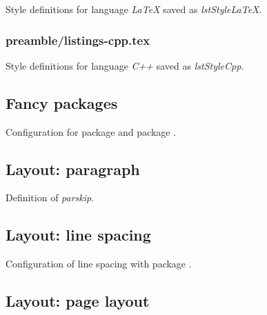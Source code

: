Style definitions for language \emph{LaTeX} saved as \emph{lstStyleLaTeX}.


\subsubsection{preamble/listings-cpp.tex}

Style definitions for language \emph{C++} saved as \emph{lstStyleCpp}.



\subsection{Fancy packages}
\label{sec:style:fancy}

Configuration for package  and package .


\subsection{Layout: paragraph}
\label{sec:style:layout:paragraph}

Definition of \emph{parskip}.


\subsection{Layout: line spacing}
\label{sec:style:layout:linespacing}

Configuration of line spacing with package .


\subsection{Layout: page layout}
\label{sec:style:layout:page}

